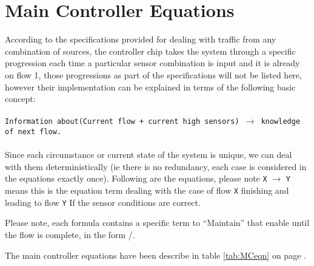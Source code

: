 \section{Main Controller Equations}
According to the specifications provided for dealing with traffic from any
combination of sources, the controller chip takes the system through a specific
progression each time a particular sensor combination is input and it is already
on flow 1, those progressions as part of the specifications will not be listed
here, however their implementation can be explained in terms of the following
basic concept:\\
\\
\texttt{Information about(Current flow + current high sensors) $\to$ knowledge of next
flow.} \\
\\
Since each circumstance or current state of the system is unique, we can deal
with them deterministically (ie there is no redundancy, each case is considered
in the equations exactly once). Following are the equations, please note
\texttt{X} $\to$ \texttt{Y} means this is the equation term dealing with the
case of flow \texttt{X} finishing and leading to flow \texttt{Y} If the sensor
conditions are correct.

Please note, each \ENX formula contains a specific term to ``Maintain'' that
enable until the flow is complete, in the form \ENX * /\FFX.

The main controller equations have been describe in table \ref{tab:MCeqn} on
page \pageref{tab:MCeqn}.



